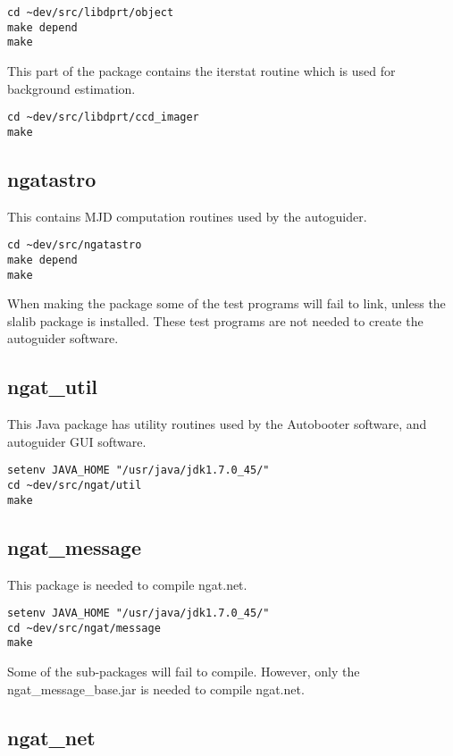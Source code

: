 \documentclass[10pt,a4paper]{article}
\begin{document}
\begin{verbatim}
cd ~dev/src/libdprt/object
make depend
make
\end{verbatim}

This part of the package contains the iterstat routine which is used for background estimation.

\begin{verbatim}
cd ~dev/src/libdprt/ccd_imager
make
\end{verbatim}

\subsection{ngatastro}

This contains MJD computation routines used by the autoguider.

\begin{verbatim}
cd ~dev/src/ngatastro
make depend
make
\end{verbatim}

When making the package some of the test programs will fail to link, unless the slalib package is installed. These test
programs are not needed to create the autoguider software.

\subsection{ngat\_util}

This Java package has utility routines used by the Autobooter software, and autoguider GUI software.

\begin{verbatim}
setenv JAVA_HOME "/usr/java/jdk1.7.0_45/"
cd ~dev/src/ngat/util
make
\end{verbatim}

\subsection{ngat\_message}

This package is needed to compile ngat.net.

\begin{verbatim}
setenv JAVA_HOME "/usr/java/jdk1.7.0_45/"
cd ~dev/src/ngat/message
make
\end{verbatim}

Some of the sub-packages will fail to compile. However, only the ngat\_message\_base.jar is needed to compile ngat.net.

\subsection{ngat\_net}
\end{document}
